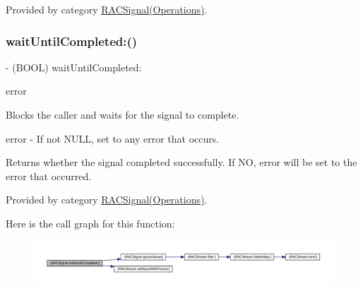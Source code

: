 Provided by category \mbox{\hyperlink{category_r_a_c_signal_07_operations_08_af4c476fc335ca830841bd4fd267f05ce}{R\+A\+C\+Signal(\+Operations)}}.

\mbox{\label{interface_r_a_c_signal_af4c476fc335ca830841bd4fd267f05ce}} 
\subsubsection{\texorpdfstring{wait\+Until\+Completed\+:()}{waitUntilCompleted:()}\hspace{0.1cm}{\footnotesize\ttfamily [2/3]}}
{\footnotesize\ttfamily -\/ (B\+O\+OL) wait\+Until\+Completed\+: \begin{DoxyParamCaption}\item[{(N\+S\+Error $\ast$$\ast$)}]{error }\end{DoxyParamCaption}}

Blocks the caller and waits for the signal to complete.

error -\/ If not N\+U\+LL, set to any error that occurs.

Returns whether the signal completed successfully. If NO, {\ttfamily error} will be set to the error that occurred. 

Provided by category \mbox{\hyperlink{category_r_a_c_signal_07_operations_08_af4c476fc335ca830841bd4fd267f05ce}{R\+A\+C\+Signal(\+Operations)}}.

Here is the call graph for this function\+:\nopagebreak
\begin{figure}[H]
\begin{center}
\leavevmode
\includegraphics[width=350pt]{interface_r_a_c_signal_af4c476fc335ca830841bd4fd267f05ce_cgraph}
\end{center}
\end{figure}
\mbox{\label{interface_r_a_c_signal_af4c476fc335ca830841bd4fd267f05ce}} 
